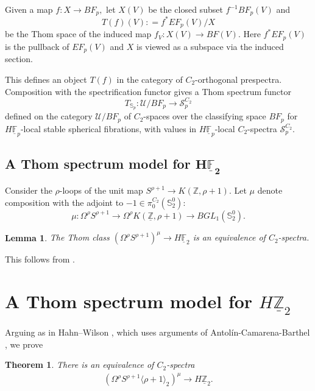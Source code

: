 \documentclass[]{amsart}  %
\newtheorem{theorem}{Theorem}[section]
\newtheorem{lemma}[equation]{Lemma}
\theoremstyle{definition}
\numberwithin{equation}{section}
\numberwithin{figure}{section}
\newcommand{\mF}{{\mathbb F}}
\newcommand{\mS}{{\mathbb S}}
\newcommand{\mZ}{{\mathbb Z}}
\newcommand{\umF}{\underline{\mF}}
\newcommand{\umZ}{\underline{\mZ}}
\newcommand{\0}{\langle 0 \rangle}
\begin{document}
Given a map $f: X \to BF_p,$ let $X(V)$ be the closed subset $f^{-1} BF_p(V)$ and 
$$T(f)(V): = f^* EF_p(V)/X $$
be the Thom space of the induced map $f_V: X(V) \to BF(V).$ Here $f^*EF_p(V)$ is the pullback of $EF_p(V)$ and $X$ is viewed as a subspace via the induced section. 

This defines an object $T(f)$ in the category of $C_2$-orthogonal prespectra. Composition with the spectrification functor gives a Thom spectrum functor 
$$T_{\mS_p}: \mathcal{U} / BF_p \to \mathcal{S}^{C_2}_{p}$$
defined on the category $\mathcal{U} / BF_p$ of $C_2$-spaces over the classifying space $BF_p$ for $H\umF_p$-local stable spherical fibrations, with values in $H \umF_p$-local $C_2$-spectra $\mathcal{S}^{C_2}_{p}.$

\subsection{A Thom spectrum model for $\mathbf{H \umF_2}$} \label{sec:ThomModF2} 

Consider the $\rho$-loops of the unit map $S^{\rho + 1} \to K(\mZ, \rho + 1).$ Let $\mu$ denote composition with the adjoint to $-1 \in \pi_0^{C_2} (\mS_2^0):$ 
    $$ \mu: \Omega^\rho S^{\rho + 1} \to \Omega^\rho K(\umZ, \rho + 1) \to BG L_1(\mS_2^0).$$
\begin{lemma}
     \label{obs:HF2Thom}
The Thom class $(\Omega^\rho S^{\rho + 1})^\mu \to H \umF_2$ is an equivalence of $C_2$-spectra.
\end{lemma}
This follows from \cite[Proof of Theorem A]{Levy22}.

\section{A Thom spectrum model for $H \umZ_2$} \label{sec:ThomMod}
Arguing as in Hahn--Wilson \cite[Theorem~9.1]{HW2020}, which uses arguments of Antol\'{i}n-Camarena-Barthel \cite[\textsection~5.2]{AnCamBarth2019}, we prove 
\begin{theorem} \label{thm:HZcomp}
       There is an equivalence of $C_2$-spectra
    \begin{align*}
        (\Omega^\rho S^{\rho + 1} \langle \rho + 1 \rangle_2)^\mu \to H \umZ_2. 
    \end{align*}
    \end{theorem}
\end{document}
